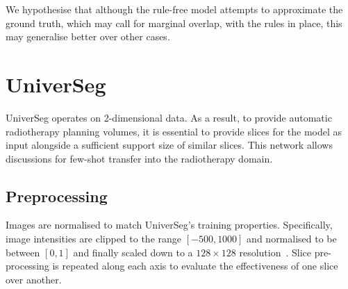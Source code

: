 \documentclass[11pt,twoside]{report}
\begin{document}
We hypothesise that although the rule-free model attempts to approximate the ground truth, which may call for marginal overlap, with the rules in place, this may generalise better over other cases.

\section{UniverSeg}


UniverSeg operates on 2-dimensional data. As a result, to provide automatic radiotherapy planning volumes, it is essential to provide slices for the model as input alongside a sufficient support size of similar slices. This network allows discussions for few-shot transfer into the radiotherapy domain.

\subsection{Preprocessing}

Images are normalised to match UniverSeg's training properties. Specifically, image intensities are clipped to the range $[-500, 1000]$ and normalised to be between $[0,1]$ and finally scaled down to a $128 \times 128$ resolution~\cite{universeg}. Slice pre-processing is repeated along each axis to evaluate the effectiveness of one slice over another. 


\end{document}

